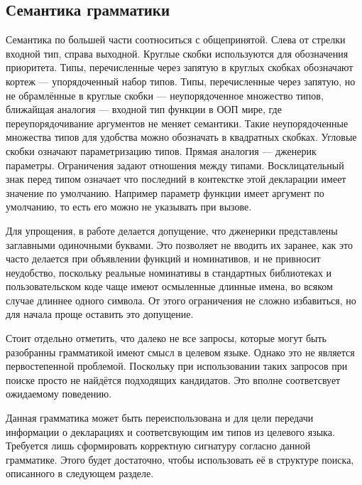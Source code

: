 \documentclass[times]{itmo-student-thesis}
\begin{document}
	\subsection{Семантика грамматики}
	Семантика по большей части соотноситься с общепринятой. Слева от стрелки входной тип, справа выходной. Круглые скобки используются для обозначения приоритета. Типы, перечисленные через запятую в круглых скобках обозначают кортеж --- упорядоченный набор типов. Типы, перечисленные через запятую, но не обрамлённые в круглые скобки --- неупорядоченное множество типов, ближайщая аналогия --- входной тип функции в ООП мире, где переупорядочивание аргументов не меняет семантики. Такие неупорядоченные множества типов для удобства можно обозначать в квадратных скобках. Угловые скобки означают параметризацию типов. Прямая аналогия --- дженерик параметры. Ограничения задают отношения между типами. Восклицательный знак перед типом означает что последний в контекстке этой декларации имеет значение по умолчанию. Например параметр функции имеет аргумент по умолчанию, то есть его можно не указывать при вызове.
	
	Для упрощения, в работе делается допущение, что дженерики представлены заглавными одиночными буквами. Это позволяет не вводить их заранее, как это часто делается при объявлении функций и номинативов, и не привносит неудобство, поскольку реальные номинативы в стандартных библиотеках и пользовательском коде чаще имеют осмыленные длинные имена, во всяком случае длиннее одного символа. От этого ограничения не сложно избавиться, но для начала проще оставить это допущение.
	
	Стоит отдельно отметить, что далеко не все запросы, которые могут быть разобранны грамматикой имеют смысл в целевом языке. Однако это не является первостепенной проблемой. Поскольку при использовании таких запросов при поиске просто не найдётся подходящих кандидатов. Это вполне соответсвует ожидаемому поведению.
	
	Данная грамматика может быть переиспользована и для цели передачи информации о декларациях и соответсвующим им типов из целевого языка. Требуется лишь сформировать корректную сигнатуру согласно данной грамматике. Этого будет достаточно, чтобы использовать её в структуре поиска, описанного в следующем разделе.
	
\end{document}
